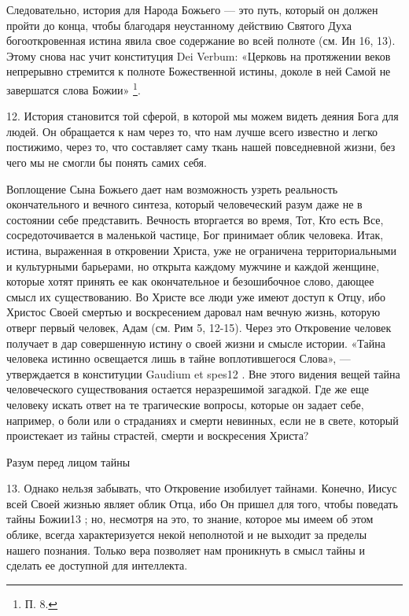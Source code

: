 \documentclass[a5paper,10pt]{article}
\begin{document}
Следовательно, история для Народа Божьего — это путь, который он должен пройти
до конца, чтобы благодаря неустанному действию Святого Духа богооткровенная
истина явила свое содержание во всей полноте (см. Ин 16, 13). Этому снова нас
учит конституция Dei Verbum: «Церковь на протяжении веков непрерывно стремится
к полноте Божественной истины, доколе в ней Самой не завершатся слова
Божии» \footnote{П. 8.}.

12. История становится той сферой, в которой мы можем видеть деяния Бога для
людей. Он обращается к нам через то, что нам лучше всего известно и легко
постижимо, через то, что составляет саму ткань нашей повседневной жизни, без
чего мы не смогли бы понять самих себя.

Воплощение Сына Божьего дает нам возможность узреть реальность окончательного и
вечного синтеза, который человеческий разум даже не в состоянии себе
представить. Вечность вторгается во время, Тот, Кто есть Все, сосредоточивается
в маленькой частице, Бог принимает облик человека. Итак, истина, выраженная в
откровении Христа, уже не ограничена территориальными и культурными барьерами,
но открыта каждому мужчине и каждой женщине, которые хотят принять ее как
окончательное и безошибочное слово, дающее смысл их существованию. Во Христе
все люди уже имеют доступ к Отцу, ибо Христос Своей смертью и воскресением
даровал нам вечную жизнь, которую отверг первый человек, Адам (см. Рим 5,
12-15). Через это Откровение человек получает в дар совершенную истину о своей
жизни и смысле истории. «Тайна человека истинно освещается лишь в тайне
воплотившегося Слова», — утверждается в конституции Gaudium et spes12 . Вне
этого видения вещей тайна человеческого существования остается неразрешимой
загадкой. Где же еще человеку искать ответ на те трагические вопросы, которые
он задает себе, например, о боли или о страданиях и смерти невинных, если не в
свете, который проистекает из тайны страстей, смерти и воскресения Христа?

Разум перед лицом тайны

13. Однако нельзя забывать, что Откровение изобилует тайнами. Конечно, Иисус
всей Своей жизнью являет облик Отца, ибо Он пришел для того, чтобы поведать
тайны Божии13 ; но, несмотря на это, то знание, которое мы имеем об этом
облике, всегда характеризуется некой неполнотой и не выходит за пределы нашего
познания. Только вера позволяет нам проникнуть в смысл тайны и сделать ее
доступной для интеллекта.
\end{document}

